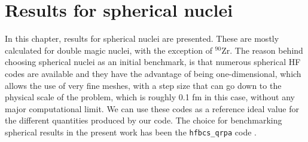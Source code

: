 \chapter{Results for spherical nuclei}
\label{chap:res_sph}
In this chapter, results for spherical nuclei are presented. These are mostly calculated for double magic nuclei, with the exception of $^{90}$Zr.
The reason behind choosing spherical nuclei as an initial benchmark, is that numerous spherical HF codes are available and they have the advantage of being one-dimensional, which allows the use of very fine meshes, with a step size that can go down to the physical scale of the problem, which is roughly 0.1 fm in this case, without any major computational limit. We can use these codes as a reference ideal value for the different quantities produced by our code. The choice for benchmarking spherical results in the present work has been the \texttt{hfbcs\_qrpa} code \cite{hfbcsqrpa}.

